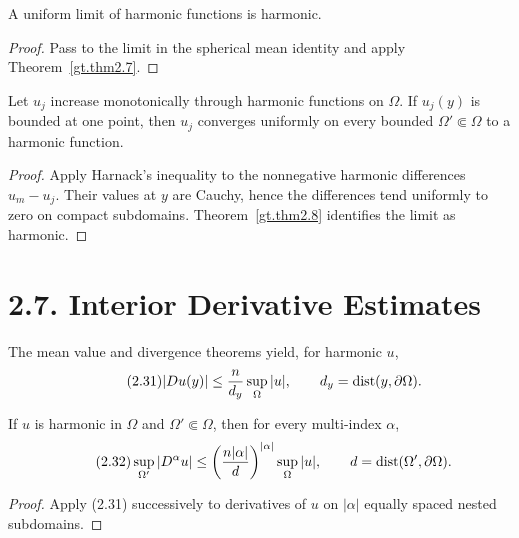 \begin{theorem}\label{gt.thm2.8}
A uniform limit of harmonic functions is harmonic.
\end{theorem}
\begin{proof}
\sketch Pass to the limit in the spherical mean identity and apply
Theorem~\ref{gt.thm2.7}.
\end{proof}

\begin{theorem}\label{gt.thm2.9}
Let $u_j$ increase monotonically through harmonic functions on $\Omega$. If
$u_j(y)$ is bounded at one point, then $u_j$ converges uniformly on every
bounded $\Omega'\Subset\Omega$ to a harmonic function.
\end{theorem}
\begin{proof}
\sketch Apply Harnack's inequality to the nonnegative harmonic differences
$u_m-u_j$. Their values at $y$ are Cauchy, hence the differences tend
uniformly to zero on compact subdomains. Theorem~\ref{gt.thm2.8} identifies
the limit as harmonic.
\end{proof}

\section*{2.7. Interior Derivative Estimates}

The mean value and divergence theorems yield, for harmonic $u$,
\begin{equation}
\tag{2.31}
|Du(y)|\leq\frac{n}{d_y}\sup_\Omega|u|,
\qquad d_y=\operatorname{dist}(y,\partial\Omega).
\end{equation}

\begin{theorem}
\label{gt.thm2.10}
If $u$ is harmonic in $\Omega$ and $\Omega'\Subset\Omega$, then for every
multi-index $\alpha$,
\begin{equation}
\tag{2.32}
\sup_{\Omega'}|D^\alpha u|
\leq\left(\frac{n|\alpha|}{d}\right)^{|\alpha|}
\sup_\Omega|u|,
\qquad d=\operatorname{dist}(\Omega',\partial\Omega).
\end{equation}
\end{theorem}
\begin{proof}
\sketch Apply (2.31) successively to derivatives of $u$ on
$|\alpha|$ equally spaced nested subdomains.
\end{proof}

